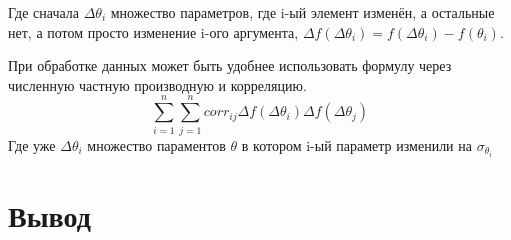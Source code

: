 \documentclass[a4paper,12pt]{article}
\begin{document}
 Где  сначала $\Delta \theta_i$ множество параметров, где i-ый элемент изменён, а остальные нет, а потом просто изменение i-ого аргумента,
  $\Delta f(\Delta \theta_i) = f(\Delta \theta_i) - f(\theta_i)$.

При обработке данных может быть удобнее использовать формулу через численную частную производную и корреляцию.
\[  \sum_{i=1}^{n}\sum_{j=1}^{n} corr_{ij}\Delta f(\Delta \theta_i)\Delta f(\Delta \theta_j) \]
Где уже $\Delta \theta_i$ множество параментов $\theta$ в котором i-ый параметр изменили на $\sigma_{\theta_i}$ 
\section{Вывод}
\end{document}
